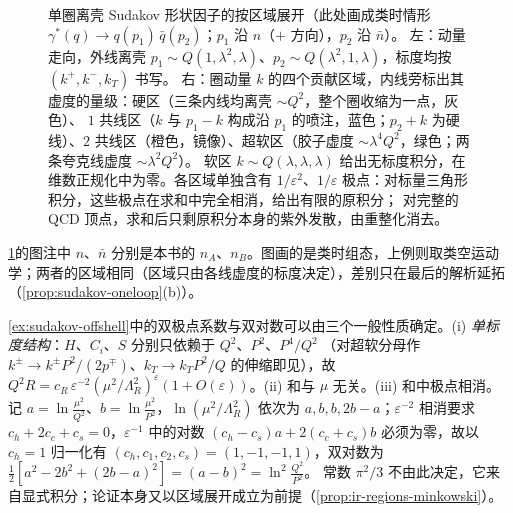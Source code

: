 \begin{figure}[htbp]
\caption{单圈离壳 Sudakov 形状因子的按区域展开（此处画成类时情形 $\gamma^*(q)\to q(p_1)\,\bar q(p_2)$；$p_1$ 沿 $n$（$+$ 方向），$p_2$ 沿 $\bar n$）。
左：动量走向，外线离壳 $p_1\sim Q(1,\lambda^2,\lambda)$、$p_2\sim Q(\lambda^2,1,\lambda)$，标度均按 $(k^+,k^-,k_T)$ 书写。
右：圈动量 $k$ 的四个贡献区域，内线旁标出其虚度的量级：硬区（三条内线均离壳 $\sim Q^2$，整个圈收缩为一点，灰色）、
$1$ 共线区（$k$ 与 $p_1-k$ 构成沿 $p_1$ 的喷注，蓝色；$p_2+k$ 为硬线）、$2$ 共线区（橙色，镜像）、超软区（胶子虚度 $\sim\lambda^4Q^2$，绿色；两条夸克线虚度 $\sim\lambda^2Q^2$）。
软区 $k\sim Q(\lambda,\lambda,\lambda)$ 给出无标度积分，在维数正规化中为零。各区域单独含有 $1/\varepsilon^2$、$1/\varepsilon$ 极点：对标量三角形积分，这些极点在求和中完全相消，给出有限的原积分；
对完整的 QCD 顶点，求和后只剩原积分本身的紫外发散，由重整化消去。}
\label{fig:sudakov-ff}
\end{figure}

\cref{fig:sudakov-ff}的图注中 $n$、$\bar n$ 分别是本书的 $n_A$、$n_B$。图画的是类时组态，上例则取类空运动学；两者的区域相同（区域只由各线虚度的标度决定），差别只在最后的解析延拓（\cref{prop:sudakov-oneloop}(b)）。

\begin{remark}\label{rem:sudakov-consistency}
\cref{ex:sudakov-offshell}中的双极点系数与双对数可以由三个一般性质确定。(i) \emph{单标度结构}：$H$、$C_i$、$S$ 分别只依赖于 $Q^2$、$P^2$、$P^4/Q^2$
（对超软分母作 $k^\pm\to k^\pm P^2/(2p^\mp)$、$k_T\to k_TP^2/Q$ 的伸缩即见），故 $Q^2R=c_R\,\varepsilon^{-2}(\mu^2/\Lambda_R^2)^\varepsilon(1+O(\varepsilon))$。(ii) 和与 $\mu$ 无关。(iii) 和中极点相消。
记 $a=\ln\frac{\mu^2}{Q^2}$、$b=\ln\frac{\mu^2}{P^2}$，$\ln(\mu^2/\Lambda_R^2)$ 依次为 $a,b,b,2b-a$；$\varepsilon^{-2}$ 相消要求 $c_h+2c_c+c_s=0$，$\varepsilon^{-1}$ 中的对数 $(c_h-c_s)a+2(c_c+c_s)b$
必须为零，故以 $c_h=1$ 归一化有 $(c_h,c_1,c_2,c_s)=(1,-1,-1,1)$，双对数为 $\frac12[a^2-2b^2+(2b-a)^2]=(a-b)^2=\ln^2\frac{Q^2}{P^2}$。
常数 $\pi^2/3$ 不由此决定，它来自显式积分；论证本身又以区域展开成立为前提（\cref{prop:ir-regions-minkowski}）。
\end{remark}

